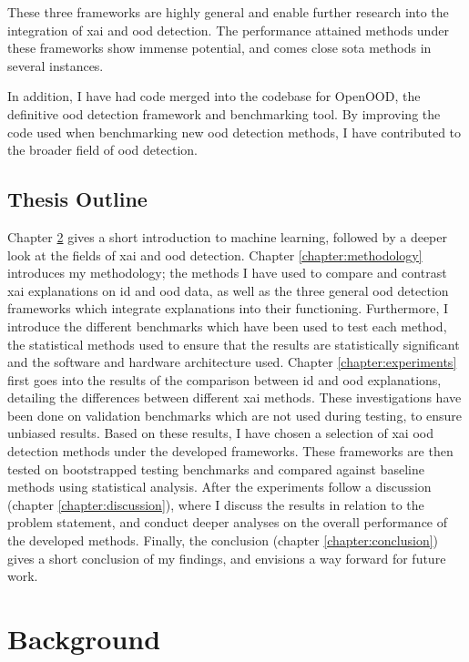 \documentclass[UKenglish]{uiomasterthesis} %
\theoremstyle{definition}
\begin{document}
These three frameworks are highly general and enable further research into the integration of \ac{xai} and \ac{ood} detection. The performance attained methods under these frameworks show immense potential, and comes close \ac{sota} methods in several instances.

In addition, I have had code merged into the codebase for OpenOOD, the definitive \ac{ood} detection framework and benchmarking tool. By improving the code used when benchmarking new \ac{ood} detection methods, I have contributed to the broader field of \ac{ood} detection.

\section{Thesis Outline}

Chapter \ref{chapter:background} gives a short introduction to machine learning, followed by a deeper look at the fields of \ac{xai} and \ac{ood} detection. Chapter \ref{chapter:methodology} introduces my methodology; the methods I have used to compare and contrast \ac{xai} explanations on \ac{id} and \ac{ood} data, as well as the three general \ac{ood} detection frameworks which integrate explanations into their functioning. Furthermore, I introduce the different benchmarks which have been used to test each method, the statistical methods used to ensure that the results are statistically significant and the software and hardware architecture used. Chapter \ref{chapter:experiments} first goes into the results of the comparison between \ac{id} and \ac{ood} explanations, detailing the differences between different \ac{xai} methods. These investigations have been done on validation benchmarks which are not used during testing, to ensure unbiased results. Based on these results, I have chosen a selection of \ac{xai} \ac{ood} detection methods under the developed frameworks. These frameworks are then tested on bootstrapped testing benchmarks and compared against baseline methods using statistical analysis. After the experiments follow a discussion (chapter \ref{chapter:discussion}), where I discuss the results in relation to the problem statement, and conduct deeper analyses on the overall performance of the developed methods. Finally, the conclusion (chapter \ref{chapter:conclusion}) gives a short conclusion of my findings, and envisions a way forward for future work.

\chapter{Background} \label{chapter:background}
\end{document}
